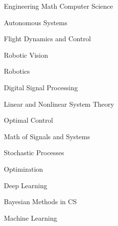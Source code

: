 
\begin{cventries}

  \cventrycol
  {Engineering}
  {Math}
  {Computer Science}
  {
    \begin{cvitems}
      \item {Autonomous Systems}
      \item {Flight Dynamics and Control}
      \item {Robotic Vision}
      \item {Robotics}
      \item {Digital Signal Processing}
    \end{cvitems}
  }
  {
    \begin{cvitems}
      \item {Linear and Nonlinear System Theory}
      \item {Optimal Control}
      \item {Math of Signals and Systems}
      \item {Stochastic Processes}
      \item {Optimization}
    \end{cvitems}
  }
  {
    \begin{cvitems}
      \item {Deep Learning}
      \item {Bayesian Methods in CS}
      \item {Machine Learning}
    \end{cvitems}
  }

\end{cventries}

